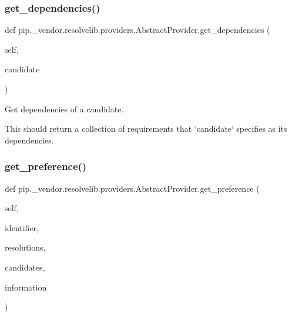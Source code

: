 \subsubsection{\texorpdfstring{get\+\_\+dependencies()}{get\_dependencies()}}
{\footnotesize\ttfamily def pip.\+\_\+vendor.\+resolvelib.\+providers.\+Abstract\+Provider.\+get\+\_\+dependencies (\begin{DoxyParamCaption}\item[{}]{self,  }\item[{}]{candidate }\end{DoxyParamCaption})}

\begin{DoxyVerb}Get dependencies of a candidate.

This should return a collection of requirements that `candidate`
specifies as its dependencies.
\end{DoxyVerb}
 \mbox{\label{classpip_1_1__vendor_1_1resolvelib_1_1providers_1_1AbstractProvider_a9247b254e4505ec66b2b164ab26ba94b}} 
\subsubsection{\texorpdfstring{get\+\_\+preference()}{get\_preference()}}
{\footnotesize\ttfamily def pip.\+\_\+vendor.\+resolvelib.\+providers.\+Abstract\+Provider.\+get\+\_\+preference (\begin{DoxyParamCaption}\item[{}]{self,  }\item[{}]{identifier,  }\item[{}]{resolutions,  }\item[{}]{candidates,  }\item[{}]{information }\end{DoxyParamCaption})}


